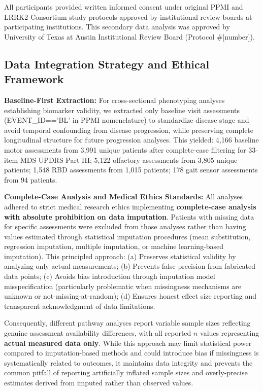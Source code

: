 \documentclass[11pt]{article}
\begin{document}
All participants provided written informed consent under original PPMI and LRRK2 Consortium study protocols approved by institutional review boards at participating institutions. This secondary data analysis was approved by University of Texas at Austin Institutional Review Board (Protocol \#[number]).

\subsection{Data Integration Strategy and Ethical Framework}

\textbf{Baseline-First Extraction:} For cross-sectional phenotyping analyses establishing biomarker validity, we extracted only baseline visit assessments (EVENT\_ID=='BL' in PPMI nomenclature) to standardize disease stage and avoid temporal confounding from disease progression, while preserving complete longitudinal structure for future progression analyses. This yielded: 4,166 baseline motor assessments from 3,991 unique patients after complete-case filtering for 33-item MDS-UPDRS Part III; 5,122 olfactory assessments from 3,805 unique patients; 1,548 RBD assessments from 1,015 patients; 178 gait sensor assessments from 94 patients.

\textbf{Complete-Case Analysis and Medical Ethics Standards:} All analyses adhered to strict medical research ethics implementing \textbf{complete-case analysis with absolute prohibition on data imputation}. Patients with missing data for specific assessments were excluded from those analyses rather than having values estimated through statistical imputation procedures (mean substitution, regression imputation, multiple imputation, or machine learning-based imputation). This principled approach: (a) Preserves statistical validity by analyzing only actual measurements; (b) Prevents false precision from fabricated data points; (c) Avoids bias introduction through imputation model misspecification (particularly problematic when missingness mechanisms are unknown or not-missing-at-random); (d) Ensures honest effect size reporting and transparent acknowledgment of data limitations.

Consequently, different pathway analyses report variable sample sizes reflecting genuine assessment availability differences, with all reported $n$ values representing \textbf{actual measured data only}. While this approach may limit statistical power compared to imputation-based methods and could introduce bias if missingness is systematically related to outcomes, it maintains data integrity and prevents the common pitfall of reporting artificially inflated sample sizes and overly-precise estimates derived from imputed rather than observed values.
\end{document}

